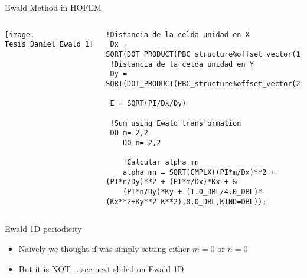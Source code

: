 %
%


    \begin{frame}{\GreenTEw}

    
    \begin{block}{Ewald Method in HOFEM}
    \begin{columns}[T]
      \texttt{[image: Tesis\_Daniel\_Ewald\_1]} 
      \begin{lstlisting}[style=myFORTRANcodeS,basicstyle=\ttfamily\tiny]
!Distancia de la celda unidad en X
 Dx = SQRT(DOT_PRODUCT(PBC_structure%offset_vector(1,:),PBC_structure%offset_vector(1,:)))
 !Distancia de la celda unidad en Y
 Dy = SQRT(DOT_PRODUCT(PBC_structure%offset_vector(2,:),PBC_structure%offset_vector(2,:)))
    
 E = SQRT(PI/Dx/Dy)

 !Sum using Ewald transformation
 DO m=-2,2
    DO n=-2,2

    !Calcular alpha_mn
    alpha_mn = SQRT(CMPLX((PI*m/Dx)**2 + (PI*n/Dy)**2 + (PI*m/Dx)*Kx + &
    (PI*n/Dy)*Ky + (1.0_DBL/4.0_DBL)*(Kx**2+Ky**2-K**2),0.0_DBL,KIND=DBL));
      \end{lstlisting}
    \end{columns}
  \end{block}


  \begin{block}{Ewald 1D periodicity}
    \begin{itemize}
    \item Naively we thought if was simply setting
      either $m=0$ or $n=0$
    \item \alert{But it is NOT} \ldots
      \hyperlink{Ewald1D}{see next slided on Ewald 1D}
    \end{itemize}
  \end{block}

  \end{frame}

      \usetikzlibrary {arrows.meta}
  
